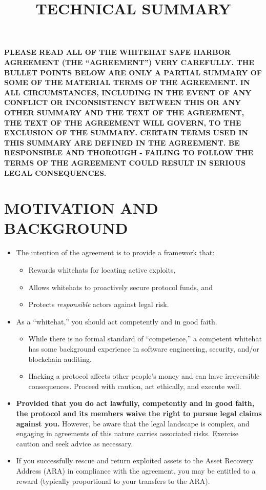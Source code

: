 \documentclass{article}
\title{\large
    TECHNICAL SUMMARY}
\author{}
\date{}
\begin{document}
\maketitle

\section*{}
\textbf{PLEASE READ ALL OF THE WHITEHAT SAFE HARBOR AGREEMENT (THE “AGREEMENT”) VERY CAREFULLY. THE BULLET POINTS BELOW ARE ONLY A PARTIAL SUMMARY OF SOME OF THE MATERIAL TERMS OF THE AGREEMENT. IN ALL CIRCUMSTANCES, INCLUDING IN THE EVENT OF ANY CONFLICT OR INCONSISTENCY BETWEEN THIS OR ANY OTHER SUMMARY AND THE TEXT OF THE AGREEMENT, THE TEXT OF THE AGREEMENT WILL GOVERN, TO THE EXCLUSION OF THE SUMMARY. CERTAIN TERMS USED IN THIS SUMMARY ARE DEFINED IN THE AGREEMENT. BE RESPONSIBLE AND THOROUGH - FAILING TO FOLLOW THE TERMS OF THE AGREEMENT COULD RESULT IN SERIOUS LEGAL CONSEQUENCES.}

\section{MOTIVATION AND BACKGROUND}
\begin{itemize}
    \item The intention of the agreement is to provide a framework that:
          \begin{itemize}
              \item Rewards whitehats for locating active exploits,
              \item Allows whitehats to proactively secure protocol funds, and
              \item Protects \textit{responsible} actors against legal risk.
          \end{itemize}
    \item As a “whitehat,” you should act competently and in good faith.
          \begin{itemize}
              \item While there is no formal standard of “competence,” a competent whitehat has some background experience in software engineering, security, and/or blockchain auditing.
              \item Hacking a protocol affects other people's money and can have irreversible consequences. Proceed with caution, act ethically, and execute well.
          \end{itemize}
    \item \textbf{Provided that you do act lawfully, competently and in good faith, the protocol and its members waive the right to pursue legal claims against you.} However, be aware that the legal landscape is complex, and engaging in agreements of this nature carries associated risks. Exercise caution and seek advice as necessary.
    \item If you successfully rescue and return exploited assets to the Asset Recovery Address (ARA) in compliance with the agreement, you may be entitled to a reward (typically proportional to your transfers to the ARA).
\end{itemize}
\end{document}
